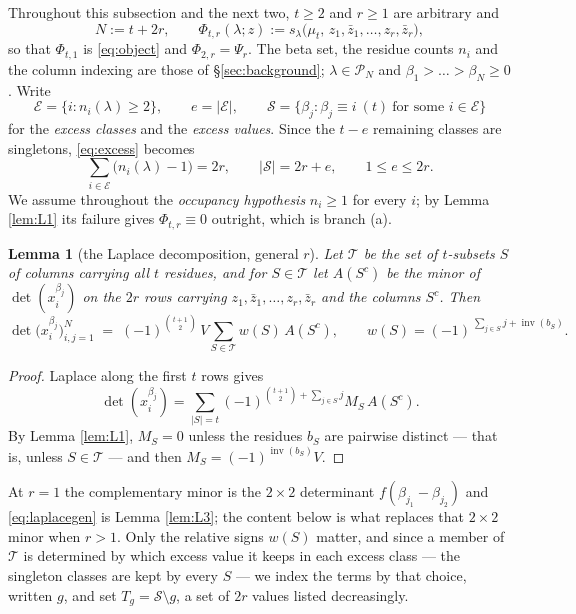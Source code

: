 \documentclass[11pt,reqno]{amsart}
\theoremstyle{plain}
\newtheorem{lemma}[theorem]{Lemma}
\theoremstyle{definition}
\newcommand{\PP}{\mathcal{P}}
\newcommand{\zt}{\mu_t}
\newcommand{\inv}{\operatorname{inv}}
\newcommand{\zb}{\bar z}
\begin{document}
Throughout this subsection and the next two, $t\ge2$ and $r\ge1$ are arbitrary and
\[
  N:=t+2r,\qquad
  \Phi_{t,r}(\lambda;z):=s_\lambda\bigl(\zt,\,z_1,\zb_1,\dots,z_r,\zb_r\bigr),
\]
so that $\Phi_{t,1}$ is \eqref{eq:object} and $\Phi_{2,r}=\Psi_r$. The beta set, the residue counts
$n_i$ and the column indexing are those of \S\ref{sec:background}; $\lambda\in\PP_N$ and
$\beta_1>\dots>\beta_N\ge0$. Write
\[
  \mathcal{E}=\{i:n_i(\lambda)\ge2\},\qquad e=|\mathcal{E}|,\qquad
  \mathcal{S}=\{\beta_j:\beta_j\equiv i\ (t)\ \text{for some } i\in\mathcal{E}\}
\]
for the \emph{excess classes} and the \emph{excess values}. Since the $t-e$ remaining classes are
singletons, \eqref{eq:excess} becomes
\begin{equation}\label{eq:excessgen}
  \sum_{i\in\mathcal{E}}\bigl(n_i(\lambda)-1\bigr)=2r,\qquad |\mathcal{S}|=2r+e,\qquad 1\le e\le2r .
\end{equation}
We assume throughout the \emph{occupancy hypothesis} $n_i\ge1$ for every $i$; by Lemma \ref{lem:L1}
its failure gives $\Phi_{t,r}\equiv0$ outright, which is branch (a).

\begin{lemma}[the Laplace decomposition, general $r$]\label{lem:L3gen}
Let $\mathcal T$ be the set of $t$-subsets $S$ of columns carrying all $t$ residues, and for
$S\in\mathcal T$ let $A(S^{c})$ be the minor of $\det(x_i^{\beta_j})$ on the $2r$ rows carrying
$z_1,\zb_1,\dots,z_r,\zb_r$ and the columns $S^{c}$. Then
\begin{equation}\label{eq:laplacegen}
  \det\bigl(x_i^{\beta_j}\bigr)_{i,j=1}^{N}
  \;=\;(-1)^{\binom{t+1}{2}}\,V\sum_{S\in\mathcal T}w(S)\,A(S^{c}),
  \qquad
  w(S)=(-1)^{\,\sum_{j\in S}j+\inv(b_S)} .
\end{equation}
\end{lemma}

\begin{proof}
Laplace along the first $t$ rows gives
\[
\det(x_i^{\beta_j})=\sum_{|S|=t}(-1)^{\binom{t+1}{2}+\sum_{j\in S}j}M_S\,A(S^{c}).
\]
By Lemma
\ref{lem:L1}, $M_S=0$ unless the residues $b_S$ are pairwise distinct --- that is, unless
$S\in\mathcal T$ --- and then $M_S=(-1)^{\inv(b_S)}V$.
\end{proof}

At $r=1$ the complementary minor is the $2\times2$ determinant $f(\beta_{j_1}-\beta_{j_2})$ and
\eqref{eq:laplacegen} is Lemma \ref{lem:L3}; the content below is what replaces that $2\times2$
minor when $r>1$. Only the relative signs $w(S)$ matter, and since a member of $\mathcal T$ is
determined by which excess value it keeps in each excess class --- the singleton classes are kept by
every $S$ --- we index the terms by that choice, written $g$, and set $T_g=\mathcal{S}\setminus g$,
a set of $2r$ values listed decreasingly.
\end{document}
